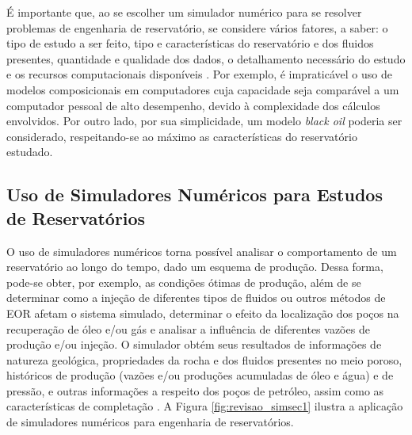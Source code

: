 \'{E} importante que, ao se escolher um simulador num\'{e}rico para se resolver problemas de engenharia de reservat\'{o}rio, se considere v\'{a}rios fatores, a saber: o tipo de estudo a ser feito, tipo e caracter\'{i}sticas do reservat\'{o}rio e dos fluidos presentes, quantidade e qualidade dos dados, o detalhamento necess\'{a}rio do estudo e os recursos computacionais dispon\'{i}veis \cite[p. 519]{engres}. Por exemplo, \'{e} impratic\'{a}vel o uso de modelos composicionais em computadores cuja capacidade seja compar\'{a}vel a um computador pessoal de alto desempenho, devido \`{a} complexidade dos c\'{a}lculos envolvidos. Por outro lado, por sua simplicidade, um modelo \textit{black oil} poderia ser considerado, respeitando-se ao m\'{a}ximo as caracter\'{i}sticas do reservat\'{o}rio estudado.

\subsection{Uso de Simuladores Num\'{e}ricos para Estudos de Reservat\'{o}rios}

O uso de simuladores num\'{e}ricos torna poss\'{i}vel analisar o comportamento de um reservat\'{o}rio ao longo do tempo, dado um esquema de produ\c{c}\~{a}o. Dessa forma, pode-se obter, por exemplo, as condi\c{c}\~{o}es \'{o}timas de produ\c{c}\~{a}o, al\'{e}m de se determinar como a inje\c{c}\~{a}o de diferentes tipos de fluidos ou outros m\'{e}todos de EOR afetam o sistema simulado, determinar o efeito da localiza\c{c}\~{a}o dos po\c{c}os na recupera\c{c}\~{a}o de \'{o}leo e/ou g\'{a}s e analisar a influ\^{e}ncia de diferentes vaz\~{o}es de produ\c{c}\~{a}o e/ou inje\c{c}\~{a}o. O simulador obt\'{e}m seus resultados de informa\c{c}\~{o}es de natureza geol\'{o}gica, propriedades da rocha e dos fluidos presentes no meio poroso, hist\'{o}ricos de produ\c{c}\~{a}o (vaz\~{o}es e/ou produ\c{c}\~{o}es acumuladas de \'{o}leo e \'{a}gua) e de press\~{a}o, e outras informa\c{c}\~{o}es a respeito dos po\c{c}os de petr\'{o}leo, assim como as caracter\'{i}sticas de completa\c{c}\~{a}o \cite[pp. 522--523]{engres}. A Figura \ref{fig:revisao_simsec1} ilustra a aplica\c{c}\~{a}o de simuladores num\'{e}ricos para engenharia de reservat\'{o}rios.

